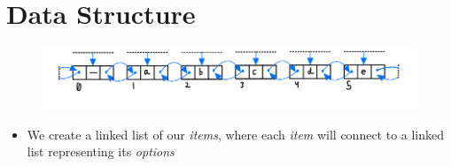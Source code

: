 \documentclass[aspectratio=169]{beamer}
\begin{document}
\section{Data Structure}
\frame{\sectionpage}

\begin{frame}{}
    \begin{figure}
        \centering
        \includegraphics[scale=0.75]{images/Algorithm_X-01-cropped.png}
    \end{figure}
    \begin{itemize}
        \item We create a linked list of our \textcolor{sigma@mainblue}{\textit{items}}, where each \textcolor{sigma@mainblue}{\textit{item}} will connect to a linked list representing its \textcolor{sigma@mainblue}{\textit{options}} 
    \end{itemize}
\end{frame}

{
\frame{}
}
\end{document}
